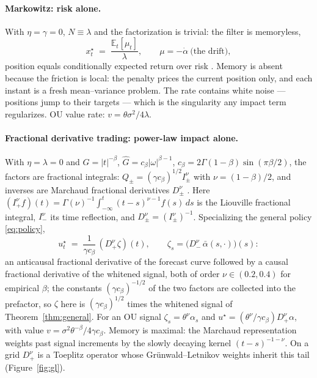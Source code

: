 \documentclass[11pt]{article}
\newcommand{\E}{\mathbb{E}}
\theoremstyle{plain}
\begin{document}
\paragraph{Markowitz: risk alone.} With $\eta=\gamma=0$, $N \equiv \lambda$ and the factorization is trivial: the filter is memoryless,
\[
x^\star_t \;=\; \frac{\E_t[\mu_t]}{\lambda}, \qquad \mu = -\dot\alpha \ \text{(the drift)},
\]
position equals conditionally expected return over risk \citep{Markowitz1952,Merton1971}. Memory is absent because the friction is local: the penalty prices the current position only, and each instant is a fresh mean--variance problem. The rate contains white noise --- positions jump to their targets --- which is the singularity any impact term regularizes. OU value rate: $v = \theta\sigma^2/4\lambda$.

\paragraph{Fractional derivative trading: power-law impact alone.} With $\eta=\lambda=0$ and $G = |t|^{-\beta}$, $\hat G = c_\beta|\omega|^{\beta-1}$, $c_\beta = 2\Gamma(1-\beta)\sin(\pi\beta/2)$, the factors are fractional integrals: $Q_\pm = (\gamma c_\beta)^{1/2} I_\pm^\nu$ with $\nu = (1-\beta)/2$, and inverses are Marchaud fractional derivatives $D_\pm^\nu$ \citep{SamkoKilbasMarichev1993}. Here $(I_+^\nu f)(t) = \Gamma(\nu)^{-1}\int_{-\infty}^t (t-s)^{\nu-1}f(s)\,ds$ is the Liouville fractional integral, $I_-^\nu$ its time reflection, and $D_\pm^\nu = (I_\pm^\nu)^{-1}$. Specializing the general policy \eqref{eq:policy},
\begin{equation}\label{eq:fractional}
u^\star_t \;=\; \frac{1}{\gamma c_\beta}\,(D_+^\nu\zeta)(t), \qquad
\zeta_s = \bigl(D_-^\nu\,\bar\alpha(s,\cdot)\bigr)(s):
\end{equation}
an anticausal fractional derivative of the forecast curve followed by a causal fractional derivative of the whitened signal, both of order $\nu\in(0.2,0.4)$ for empirical $\beta$; the constants $(\gamma c_\beta)^{-1/2}$ of the two factors are collected into the prefactor, so $\zeta$ here is $(\gamma c_\beta)^{1/2}$ times the whitened signal of Theorem~\ref{thm:general}. For an OU signal $\zeta_s = \theta^\nu\alpha_s$ and $u^\star = (\theta^\nu/\gamma c_\beta)D_+^\nu\alpha$, with value $v = \sigma^2\theta^{-\beta}/4\gamma c_\beta$. Memory is maximal: the Marchaud representation weights past signal increments by the slowly decaying kernel $(t-s)^{-1-\nu}$. On a grid $D_+^\nu$ is a Toeplitz operator whose Gr\"unwald--Letnikov weights inherit this tail (Figure~\ref{fig:gl}).
\end{document}
